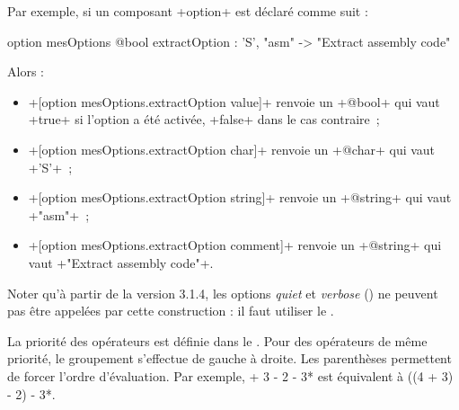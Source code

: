 Par exemple, si un composant \ggst+option+ est déclaré comme suit :
\begin{galgas3}
option mesOptions {
  @bool extractOption : 'S', "asm" -> "Extract assembly code"
}
\end{galgas3}

Alors :
\begin{itemize}
  \item \ggst+[option mesOptions.extractOption value]+ renvoie un \ggst+@bool+ qui vaut \ggst+true+ si l'option a été activée, \ggst+false+ dans le cas contraire~;
  \item \ggst+[option mesOptions.extractOption char]+ renvoie un \ggst+@char+ qui vaut \ggst+'S'+~;
  \item \ggst+[option mesOptions.extractOption string]+ renvoie un \ggst+@string+ qui vaut \ggst+"asm"+~;
  \item \ggst+[option mesOptions.extractOption comment]+ renvoie un \ggst+@string+ qui vaut \ggst+"Extract assembly code"+.
\end{itemize}

Noter qu'à partir de la version 3.1.4, les options \emph{quiet} et \emph{verbose} () ne peuvent pas être appelées par cette construction : il faut utiliser le .






La priorité des opérateurs est définie dans le . Pour des opérateurs de même priorité, le groupement s'effectue de gauche à droite. Les parenthèses permettent de forcer l'ordre d'évaluation. Par exemple,  + 3 - 2 - 3* est équivalent à \ggst*((4 + 3) - 2) - 3*.

